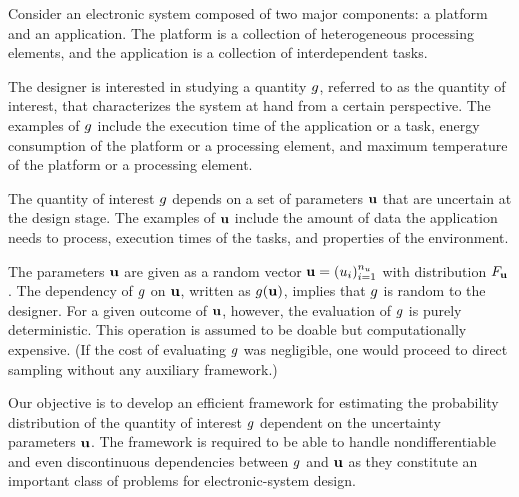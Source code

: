 Consider an electronic system composed of two major components: a platform and
an application. The platform is a collection of heterogeneous processing
elements, and the application is a collection of interdependent tasks.

The designer is interested in studying a quantity $g$, referred to as the
quantity of interest, that characterizes the system at hand from a certain
perspective. The examples of $g$ include the execution time of the application
or a task, energy consumption of the platform or a processing element, and
maximum temperature of the platform or a processing element.

The quantity of interest $g$ depends on a set of parameters $\mathbf{u}$ that are
uncertain at the design stage. The examples of $\mathbf{u}$ include the amount of data
the application needs to process, execution times of the tasks, and properties
of the environment.

The parameters $\mathbf{u}$ are given as a random vector $\mathbf{u} = (u_i)_{i = 1}^{n_u}$
with distribution $F_{\mathbf{u}}$. The dependency of $g$ on $\mathbf{u}$, written
as $g(\mathbf{u})$, implies that $g$ is random to the designer. For a given outcome
of $\mathbf{u}$, however, the evaluation of $g$ is purely deterministic. This
operation is assumed to be doable but computationally expensive. (If the cost of
evaluating $g$ was negligible, one would proceed to direct sampling without any
auxiliary framework.)

Our objective is to develop an efficient framework for estimating the
probability distribution of the quantity of interest $g$ dependent on the
uncertainty parameters $\mathbf{u}$. The framework is required to be able to handle
nondifferentiable and even discontinuous dependencies between $g$ and $\mathbf{u}$ as
they constitute an important class of problems for electronic-system design.
